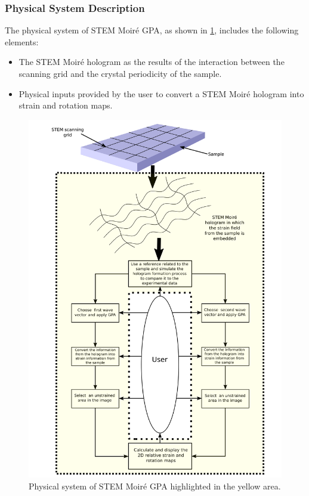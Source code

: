 \documentclass[12pt]{article}
\newcommand{\progname}{STEM Moir{\'e} GPA}
\begin{document}
\subsubsection{Physical System Description}

The physical system of \progname{}, as shown in \cref{fig:system_description}, 
includes the following elements:
\begin{itemize}
\item The STEM Moir{\'e} hologram as the results of the interaction between the 
scanning grid and the crystal periodicity of the sample.
\item Physical inputs provided by the user to convert a STEM Moir{\'e} hologram 
into strain and rotation maps.
\end{itemize}

\begin{figure}[H]
\begin{center}
\includegraphics[scale=0.65]{Figures/System_description.png}
\caption{Physical system of \progname{} highlighted in the yellow area.}
\label{fig:system_description}
\end{center}
\end{figure}
\end{document}
